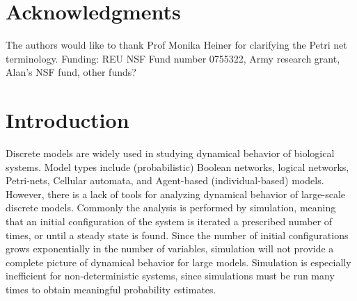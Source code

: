 \documentclass[11pt]{amsart}
\begin{document}
\section*{Acknowledgments}
The authors would like to thank Prof Monika Heiner for clarifying the Petri
net terminology.
Funding: REU NSF Fund number 0755322, Army research grant, Alan's
NSF fund, other funds?


\section{Introduction}

Discrete models are widely used in studying dynamical behavior of biological systems. Model types include
(probabilistic) Boolean networks, logical networks, Petri-nets, Cellular
automata, and Agent-based (individual-based) models. 
However, there is a lack of tools
for analyzing dynamical behavior of large-scale discrete models. Commonly the analysis is performed by simulation, meaning that an
initial configuration of the system is iterated a prescribed number of times, or until a
steady state is found. Since the number of initial configurations grows exponentially in the number of variables, simulation
will not provide a complete picture of dynamical behavior for large models.
Simulation is especially inefficient for non-deterministic
systems, since simulations must be run many times to obtain meaningful
probability estimates.
\end{document}

